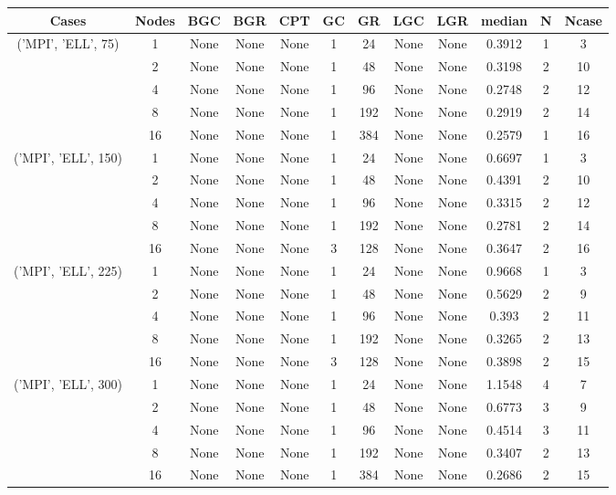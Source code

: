 \begin{tabular}{cccccccccccc}
\hline
Cases & Nodes& BGC& BGR& CPT& GC& GR& LGC& LGR& median & N & Ncase \\
\hline
\multirow{5}{*}{('MPI', 'ELL', 75)}& 1& None& None& None& 1& 24& None& None& 0.3912& 1& 3\\
& 2& None& None& None& 1& 48& None& None& 0.3198& 2& 10\\
& 4& None& None& None& 1& 96& None& None& 0.2748& 2& 12\\
& 8& None& None& None& 1& 192& None& None& 0.2919& 2& 14\\
& 16& None& None& None& 1& 384& None& None& 0.2579& 1& 16\\
\hline
\multirow{5}{*}{('MPI', 'ELL', 150)}& 1& None& None& None& 1& 24& None& None& 0.6697& 1& 3\\
& 2& None& None& None& 1& 48& None& None& 0.4391& 2& 10\\
& 4& None& None& None& 1& 96& None& None& 0.3315& 2& 12\\
& 8& None& None& None& 1& 192& None& None& 0.2781& 2& 14\\
& 16& None& None& None& 3& 128& None& None& 0.3647& 2& 16\\
\hline
\multirow{5}{*}{('MPI', 'ELL', 225)}& 1& None& None& None& 1& 24& None& None& 0.9668& 1& 3\\
& 2& None& None& None& 1& 48& None& None& 0.5629& 2& 9\\
& 4& None& None& None& 1& 96& None& None& 0.393& 2& 11\\
& 8& None& None& None& 1& 192& None& None& 0.3265& 2& 13\\
& 16& None& None& None& 3& 128& None& None& 0.3898& 2& 15\\
\hline
\multirow{5}{*}{('MPI', 'ELL', 300)}& 1& None& None& None& 1& 24& None& None& 1.1548& 4& 7\\
& 2& None& None& None& 1& 48& None& None& 0.6773& 3& 9\\
& 4& None& None& None& 1& 96& None& None& 0.4514& 3& 11\\
& 8& None& None& None& 1& 192& None& None& 0.3407& 2& 13\\
& 16& None& None& None& 1& 384& None& None& 0.2686& 2& 15\\
\hline
\end{tabular}



